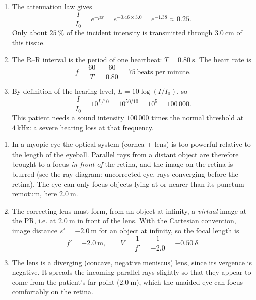 \documentclass[11pt]{article}
\newcommand{\cle}[1]{{\popxbold\color{popdark}#1}}
\begin{document}
\begin{corrige}
\begin{enumerate}
\item The attenuation law gives
\[ \frac{I}{I_0} = e^{-\mu x} = e^{-0.46 \times 3.0} = e^{-1.38} \approx 0.25. \]
Only about $25\ \%$ of the incident intensity is transmitted through $3.0\ \mathrm{cm}$ of this tissue.
\item The R--R interval is the period of one heartbeat: $T = 0.80\ \mathrm{s}$. The heart rate is
\[ f = \frac{60}{T} = \frac{60}{0.80} = 75\ \text{beats per minute}. \]
\item By definition of the hearing level, $L = 10\log(I/I_0)$, so
\[ \frac{I}{I_0} = 10^{L/10} = 10^{50/10} = 10^5 = 100\,000. \]
This patient needs a sound intensity $100\,000$ times the normal threshold at $4\ \mathrm{kHz}$: a severe hearing loss at that frequency.
\end{enumerate}
\end{corrige}

\begin{corrige}
\begin{enumerate}
\item In a myopic eye the optical system (cornea + lens) is too powerful relative to the length of the eyeball. Parallel rays from a distant object are therefore brought to a focus \emph{in front of} the retina, and the image on the retina is blurred (see the ray diagram: uncorrected eye, rays converging before the retina). The eye can only focus objects lying at or nearer than its punctum remotum, here $2.0\ \mathrm{m}$.
\item The correcting lens must form, from an object at infinity, a \emph{virtual} image at the PR, i.e. at $2.0\ \mathrm{m}$ in front of the lens. With the Cartesian convention, image distance $s' = -2.0\ \mathrm{m}$ for an object at infinity, so the focal length is
\[ f' = -2.0\ \mathrm{m}, \qquad V = \frac{1}{f'} = \frac{1}{-2.0} = -0.50\ \delta. \]
\item The lens is a \cle{diverging} (concave, negative meniscus) lens, since its vergence is negative. It spreads the incoming parallel rays slightly so that they appear to come from the patient's far point ($2.0\ \mathrm{m}$), which the unaided eye can focus comfortably on the retina.
\end{enumerate}
\end{corrige}
\end{document}

